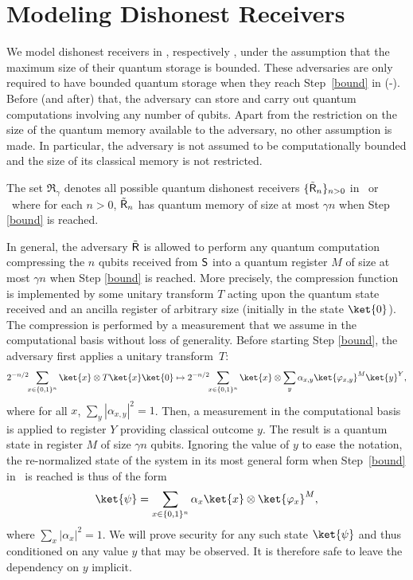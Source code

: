 \section{Modeling Dishonest Receivers} \label{sec:modeldishonestreceiversrabin}
We model dishonest receivers in \qot, respectively \eprqot, under the assumption that 
the maximum size of their quantum storage is bounded.
These adversaries are only required to have bounded quantum storage
when they reach Step~\ref{bound} in (\epr-)\qot. %
Before (and after) that, 
the adversary can store and carry out quantum computations involving any number
of qubits. Apart from the restriction on the size of the quantum
memory available to the adversary, no other assumption is made. In 
particular, the adversary is not assumed to be computationally
bounded and the size of its classical memory is not restricted. 
\begin{definition}\label{boundedstorage}
The set $\mathfrak{R}_{\gamma}$ denotes all
possible quantum dishonest receivers $\{\tilde{\sf R}_n\}_{n>0}$ in \qot\ or \eprqot\ 
where for each $n>0$, $\tilde{\sf R}_n$ has quantum memory of size 
at most $\gamma n$ when Step \ref{bound} is reached.  
\end{definition}
In general, the adversary $\tilde{\sf R}$ is allowed to perform any quantum
computation compressing the $n$ qubits received from ${\sf S}$ into a
quantum register $M$ of size at most $\gamma n$ when Step \ref{bound}
is reached. More precisely, the \index{compression}compression function is implemented by
some unitary transform $T$ acting upon the quantum state received and
an \index{ancilla}ancilla register of arbitrary size (initially in the state
$\ket{0}$). The compression is performed by a measurement that we
assume in the computational basis without loss of generality.  Before
starting Step \ref{bound}, the adversary first applies a unitary
transform~$T$:
\begin{eqnarray*}
2^{-n/2} \!\! \sum_{x\in\{0,1\}^n}\ket{x}\otimes T\ket{x}\ket{0}
  \mapsto  2^{-n/2} \!\! \sum_{x\in\{0,1\}^n} \ket{x} \otimes
 \sum_{y}\alpha_{x,y}\ket{\varphi_{x,y}}^{M}\ket{y}^{Y}, 
\end{eqnarray*}
where for all $x$, $\sum_y |\alpha_{x,y}|^2=1$.
Then, a measurement in the computational basis is applied
to register $Y$ providing classical outcome $y$. The result
is a quantum state in register $M$ of size $\gamma n$ qubits.
Ignoring the value of $y$ to ease the notation,
the re-normalized state of the system in its most general
form when Step~\ref{bound} in \eprqot\ is reached is thus of the form
\[ \ket{\psi}= 
\sum_{x\in\{0,1\}^n} \alpha_x \ket{x}\otimes\ket{\varphi_{x}}^M,
\]
where $\sum_{x} |\alpha_x|^2=1$. We will prove security for any such state $\ket{\psi}$ and thus conditioned on any value $y$ that may be observed. It is therefore safe to leave the dependency on $y$ implicit. 



